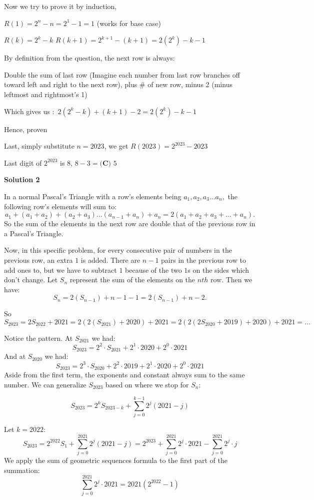 \begin{enumerate}
 Now we try to prove it by induction,

 $R(1) = 2^n - n = 2^1 - 1 = 1$ (works for base case)

 $R(k) = 2^k - k$
$R(k+1) = 2^{k+1} - (k + 1) = 2(2^k) - k - 1$

 By definition from the question, the next row is always$:$ 

 Double the sum of last row (Imagine each number from last row branches off toward left and right to the next row), plus \# of new row, minus 2 (minus leftmost and rightmost's 1)

 Which gives us $:$
$2(2^k - k) + (k + 1) - 2 = 2(2^k) - k - 1$

 Hence, proven

 Last, simply substitute $n = 2023$, we get $R(2023) = 2^{2023} - 2023$

 Last digit of $2^{2023}$ is $8$, $8-3 = \boxed{\textbf{(C) } 5}$




\textbf{Solution 2}

In a normal Pascal's Triangle with a row's elements being $a_1, a_2, a_3... a_n,$ the following row's elements will sum to: 
 \[a_1 + (a_1 + a_2) + (a_2 + a_3)...(a_{n-1} + a_n) + a_n = 2(a_1 + a_2 + a_3 + ... + a_n).\]So the sum of the elements in the next row are double that of the previous row in a Pascal's Triangle.

 Now, in this specific problem, for every consecutive pair of numbers in the previous row, an extra $1$ is added. There are $n - 1$ pairs in the previous row to add ones to, but we have to subtract $1$ because of the two $1$s on the sides which don't change. Let $S_n$ represent the sum of the elements on the $nth$ row. Then we have: 
 \[S_n = 2(S_{n - 1}) + n - 1 - 1 = 2(S_{n - 1}) + n - 2.\] 

 So 
 \[S_{2023} = 2S_{2022} + 2021 = 2(2(S_{2021}) + 2020) + 2021 = 2(2(2S_{2020} + 2019) + 2020) + 2021 = \dots\] 

 Notice the pattern. At $S_{2021}$ we had: 
 \[S_{2023} = 2^{2} \cdot S_{2021} + 2^{1} \cdot 2020 + 2^{0} \cdot 2021\] And at $S_{2020}$ we had: 
 \[S_{2023} = 2^{3} \cdot S_{2020} + 2^{2} \cdot 2019 + 2^{1} \cdot 2020 + 2^{0} \cdot 2021\] Aside from the first term, the exponents and constant always sum to the same number. We can generalize $S_{2023}$ based on where we stop for $S_{n}:$

 \[S_{2023} = 2^{k}S_{2023 - k} + \sum_{j=0}^{k-1} 2^j(2021 - j)\]

 Let $k = 2022$: 
 \[S_{2023} = 2^{2022}S_{1} + \sum_{j=0}^{2021} 2^j(2021 - j) = 2^{2023} + \sum_{j=0}^{2021} 2^j\cdot2021 - \sum_{j=0}^{2021} 2^{j}\cdot j\] We apply the sum of geometric sequences formula to the first part of the summation:
 \[\sum_{j=0}^{2021} 2^j\cdot2021 = 2021(2^{2022} - 1)\] 


\end{enumerate}
